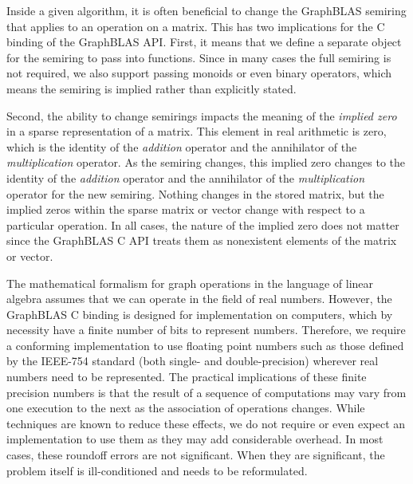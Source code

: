 Inside a given algorithm, it is often beneficial to change the GraphBLAS semiring
that applies to an operation on a matrix.  This has two 
implications for the C binding of the GraphBLAS API.  First,
it means that we define a separate object for the semiring 
to pass into functions.  Since in many cases the full
semiring is not required, we also support passing monoids or
even binary operators, which means the semiring is implied rather than 
explicitly stated.

Second, the ability to change semirings impacts the meaning of 
the \emph{implied zero} in a sparse representation of a matrix.
This element in real arithmetic is zero, which is the 
identity of the \emph{addition} operator and the annihilator of the
\emph{multiplication} operator.  As the semiring changes, this 
implied zero changes to the identity of 
the \emph{addition} operator and the annihilator of the \emph{multiplication} 
operator for the new semiring. Nothing changes in the stored matrix, but the 
implied zeros within the sparse matrix or vector change with respect to a particular operation. In all cases, 
the nature of the implied zero does not matter since the GraphBLAS C API treats them as nonexistent elements of the matrix or vector.


The mathematical formalism for graph operations in the language of 
linear algebra assumes that we can operate in the field of real numbers. 
However, the GraphBLAS C binding is designed for implementation on computers, 
which by necessity have a finite number of bits to represent numbers. 
Therefore, we require a conforming implementation to use floating point 
numbers such as those defined by the IEEE-754 standard (both single- and double-precision) 
wherever real numbers need to be represented. The practical implications of 
these finite precision numbers is that the result of a sequence of 
computations may vary from one execution to the next as the association 
of operations changes.  While techniques are known to 
reduce these effects, we do not require or even expect an implementation 
to use them as they may add considerable overhead. In most 
cases, these roundoff errors are not significant. When they are significant, 
the problem itself is ill-conditioned and needs to be reformulated.

